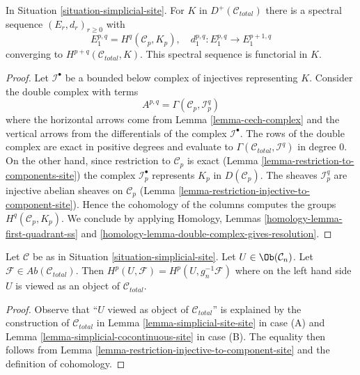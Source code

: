\begin{lemma}
\label{lemma-simplicial-sheaf-cohomology-site}
In Situation \ref{situation-simplicial-site}. For $K$ in
$D^+(\mathcal{C}_{total})$ there is a spectral sequence
$(E_r, d_r)_{r \geq 0}$ with
$$
E_1^{p, q} = H^q(\mathcal{C}_p, K_p),\quad
d_1^{p, q} : E_1^{p, q} \to E_1^{p + 1, q}
$$
converging to $H^{p + q}(\mathcal{C}_{total}, K)$.
This spectral sequence is functorial in $K$.
\end{lemma}

\begin{proof}
Let $\mathcal{I}^\bullet$ be a bounded below complex of injectives
representing $K$. Consider the double complex with terms
$$
A^{p, q} = \Gamma(\mathcal{C}_p, \mathcal{I}^q_p)
$$
where the horizontal arrows come from Lemma \ref{lemma-cech-complex}
and the vertical arrows from the differentials of the
complex $\mathcal{I}^\bullet$. The rows of the double complex are exact
in positive degrees and evaluate to
$\Gamma(\mathcal{C}_{total}, \mathcal{I}^q)$ in degree $0$.
On the other hand, since restriction to $\mathcal{C}_p$ is exact
(Lemma \ref{lemma-restriction-to-components-site})
the complex $\mathcal{I}_p^\bullet$ represents $K_p$ in
$D(\mathcal{C}_p)$. The sheaves $\mathcal{I}_p^q$ are injective
abelian sheaves on $\mathcal{C}_p$
(Lemma \ref{lemma-restriction-injective-to-component-site}).
Hence the cohomology of the columns computes the groups
$H^q(\mathcal{C}_p, K_p)$. We conclude by applying
Homology, Lemmas \ref{homology-lemma-first-quadrant-ss} and
\ref{homology-lemma-double-complex-gives-resolution}.
\end{proof}

\begin{lemma}
\label{lemma-sanity-check}
Let $\mathcal{C}$ be as in Situation \ref{situation-simplicial-site}.
Let $U \in \Ob(\mathcal{C}_n)$. Let
$\mathcal{F} \in \textit{Ab}(\mathcal{C}_{total})$.
Then $H^p(U, \mathcal{F}) = H^p(U, g_n^{-1}\mathcal{F})$
where on the left hand side $U$ is viewed as an object of $\mathcal{C}_{total}$.
\end{lemma}

\begin{proof}
Observe that ``$U$ viewed as object of $\mathcal{C}_{total}$''
is explained by the construction of $\mathcal{C}_{total}$ in
Lemma \ref{lemma-simplicial-site-site} in case (A) and
Lemma \ref{lemma-simplicial-cocontinuous-site} in case (B).
The equality then follows from
Lemma \ref{lemma-restriction-injective-to-component-site}
and the definition of cohomology.
\end{proof}






